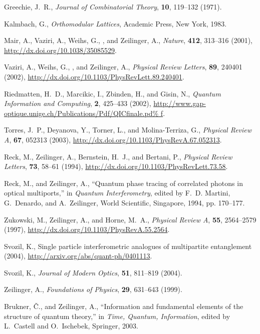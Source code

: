 \documentclass{aipproc}
\begin{document}
\begin{thebibliography}{10}
Greechie, J.~R., \emph{Journal of Combinatorial Theory}, \textbf{10}, 119--132
  (1971).

Kalmbach, G., \emph{Orthomodular Lattices}, Academic Press, New York, 1983.

Mair, A., Vaziri, A., Weihs, G., , and Zeilinger, A., \emph{Nature},
  \textbf{412}, 313--316 (2001),
  \urlprefix\url{http://dx.doi.org/10.1038/35085529}.

Vaziri, A., Weihs, G., , and Zeilinger, A., \emph{Physical Review Letters},
  \textbf{89}, 240401 (2002),
  \urlprefix\url{http://dx.doi.org/10.1103/PhysRevLett.89.240401}.

Riedmatten, H.~D., Marcikic, I., Zbinden, H., and Gisin, N., \emph{Quantum
  Information and Computing}, \textbf{2}, 425--433 (2002),
  \urlprefix\url{http://www.gap-optique.unige.ch/Publications/Pdf/QICfinale.pd%
f}.

Torres, J.~P., Deyanova, Y., Torner, L., and Molina-Terriza, G., \emph{Physical
  Review A}, \textbf{67}, 052313 (2003),
  \urlprefix\url{http://dx.doi.org/10.1103/PhysRevA.67.052313}.

Reck, M., Zeilinger, A., Bernstein, H.~J., and Bertani, P., \emph{Physical
  Review Letters}, \textbf{73}, 58--61 (1994),
  \urlprefix\url{http://dx.doi.org/10.1103/PhysRevLett.73.58}.

Reck, M., and Zeilinger, A., \enquote{Quantum phase tracing of correlated
  photons in optical multiports,} in \emph{Quantum Interferometry}, edited by
  F.~D. Martini, G.~Denardo, and A.~Zeilinger, World Scientific, Singapore,
  1994, pp. 170--177.

Zukowski, M., Zeilinger, A., and Horne, M.~A., \emph{Physical Review A},
  \textbf{55}, 2564--2579 (1997),
  \urlprefix\url{http://dx.doi.org/10.1103/PhysRevA.55.2564}.

Svozil, K., Single particle interferometric analogues of multipartite
  entanglement (2004), \urlprefix\url{http://arxiv.org/abs/quant-ph/0401113}.

Svozil, K., \emph{Journal of Modern Optics}, \textbf{51}, 811--819 (2004).

Zeilinger, A., \emph{Foundations of Physics}, \textbf{29}, 631--643 (1999).

Brukner, {\v{C}}., and Zeilinger, A., \enquote{Information and fundamental
  elements of the structure of quantum theory,} in \emph{Time, Quantum,
  Information}, edited by L.~Castell and O.~Ischebek, Springer, 2003.


\end{thebibliography}
\end{document}

